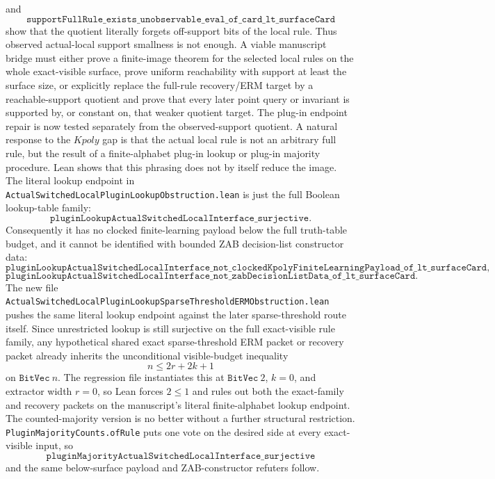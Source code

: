 \documentclass[11pt]{article}
\theoremstyle{remark}
\begin{document}
and
\[
  \texttt{supportFullRule\_exists\_unobservable\_eval\_of\_card\_lt\_surfaceCard}
\]
show that the quotient literally forgets off-support bits of the local rule.
Thus observed actual-local support smallness is not enough.  A viable
manuscript bridge must either prove a finite-image theorem for the selected
local rules on the whole exact-visible surface, prove uniform reachability
with support at least the surface size, or explicitly replace the full-rule
recovery/ERM target by a reachable-support quotient and prove that every later
point query or invariant is supported by, or constant on, that weaker quotient
target.
The plug-in endpoint repair is now tested separately from the observed-support
quotient.  A natural response to the \(Kpoly\) gap is that the actual local
rule is not an arbitrary full rule, but the result of a finite-alphabet
plug-in lookup or plug-in majority procedure.  Lean shows that this phrasing
does not by itself reduce the image.  The literal lookup endpoint in
\texttt{ActualSwitchedLocalPluginLookupObstruction.lean} is just the full
Boolean lookup-table family:
\[
  \texttt{pluginLookupActualSwitchedLocalInterface\_surjective}.
\]
Consequently it has no clocked finite-learning payload below the full
truth-table budget, and it cannot be identified with bounded ZAB
decision-list constructor data:
\[
  \texttt{pluginLookupActualSwitchedLocalInterface\_not\_clockedKpolyFiniteLearningPayload\_of\_lt\_surfaceCard},
\]
\[
  \texttt{pluginLookupActualSwitchedLocalInterface\_not\_zabDecisionListData\_of\_lt\_surfaceCard}.
\]
The new file
\texttt{ActualSwitchedLocalPluginLookupSparseThresholdERMObstruction.lean}
pushes the same literal lookup endpoint against the later sparse-threshold
route itself.  Since unrestricted lookup is still surjective on the full
exact-visible rule family, any hypothetical shared exact sparse-threshold ERM
packet or recovery packet already inherits the unconditional visible-budget
inequality
\[
  n \le 2r + 2k + 1
\]
on \(\texttt{BitVec}\ n\).  The regression file instantiates this at
\(\texttt{BitVec}\ 2\), \(k = 0\), and extractor width \(r = 0\), so Lean
forces \(2 \le 1\) and rules out both the exact-family and recovery packets on
the manuscript's literal finite-alphabet lookup endpoint.
The counted-majority version is no better without a further structural
restriction.  \texttt{PluginMajorityCounts.ofRule} puts one vote on the desired
side at every exact-visible input, so
\[
  \texttt{pluginMajorityActualSwitchedLocalInterface\_surjective}
\]
and the same below-surface payload and ZAB-constructor refuters follow.
\end{document}
